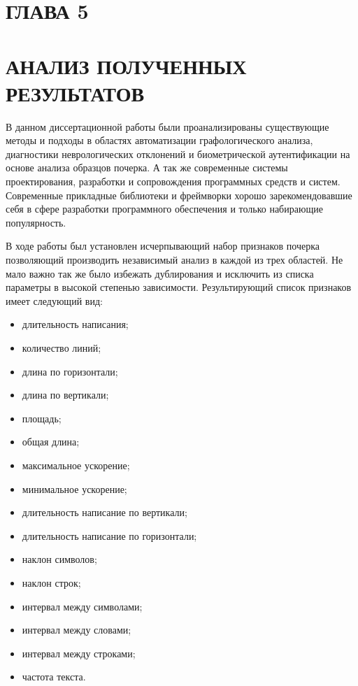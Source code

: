 \section*{ГЛАВА 5}
\section*{АНАЛИЗ ПОЛУЧЕННЫХ РЕЗУЛЬТАТОВ}
\label{sec:summary}
\setcounter{section}{5}
\setcounter{subsection}{0}
\bigskip

В данном диссертационной работы были проанализированы существующие методы и подходы в областях автоматизации графологического анализа, диагностики неврологических отклонений и биометрической аутентификации на основе анализа образцов почерка. А так же современные системы проектирования, разработки и сопровождения программных средств и систем. Современные прикладные библиотеки и фреймворки хорошо зарекомендовавшие себя в сфере разработки программного обеспечения и только набирающие популярность.

В ходе работы был установлен исчерпывающий набор признаков почерка позволяющий производить независимый анализ в каждой из трех областей. Не мало важно так же было избежать дублирования и исключить из списка параметры в высокой степенью зависимости.
Результирующий список признаков имеет следующий вид:
\begin{itemize}
  \item длительность написания;  
  \item количество линий;
  \item длина по горизонтали;
  \item длина по вертикали;
  \item площадь;
  \item общая длина;
  \item максимальное ускорение;
  \item минимальное ускорение;
  \item длительность написание по вертикали;
  \item длительность написание по горизонтали;
  \item наклон символов;
  \item наклон строк;
  \item интервал между символами;
  \item интервал между словами;
  \item интервал между строками;
  \item частота текста.
\end{itemize}

